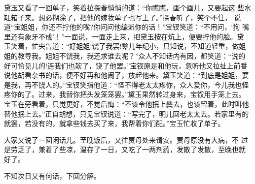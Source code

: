 黛玉又看了一回单子，笑着拉探春悄悄的道：“你瞧瞧，画个画儿，又要起这
些水缸箱子来。想必糊涂了，把他的嫁妆单子也写上了。”探春听了，笑个不住，
说道“宝姐姐，你还不拧他的嘴?你问问他编派你的话！”宝钗笑道：“不用问，‘狗
嘴里还有象牙不成’！”一面说，一面走上来，把黛玉按在炕上，便要拧他的脸。黛
玉笑着，忙央告道：“好姐姐!饶了我罢!颦儿年纪小，只知说，不知道轻重，做姐
姐的教导我。姐姐不饶我，我还求谁去呢？”众人不知话内有因，都笑道：“说的
好可怜见儿的!连我们也软了，饶了他罢。”宝钗原是和他玩，忽听他又拉扯上前番
说他胡看杂书的话，便不好再和他闹了，放起他来。黛玉笑道：“到底是姐姐，要
是我，再不饶人的。”宝钗笑指他道：“怪不得老太太疼你，众人爱你，今儿我也怪
疼你的了。过来，我替你把头发笼笼罢。”黛玉果然转过身来，宝钗用手笼上去。
宝玉在旁看着，只觉更好，不觉后悔：“不该令他抿上鬓去，也该留着，此时叫他
替他抿上去。”正自胡想，只见宝钗说道：“写完了，明儿回老太太去。若家里有的
就罢，若没有的，就拿些钱去买了来，我帮着你们配。”宝玉忙收了单子。

大家又说了一回闲话儿。至晚饭后，又往贾母处来请安。贾母原没有大病，不
过是劳乏了，兼着了些凉，温存了一日，又吃了一两剂药，发散了发散，至晚也就
好了。

不知次日又有何话，下回分解。